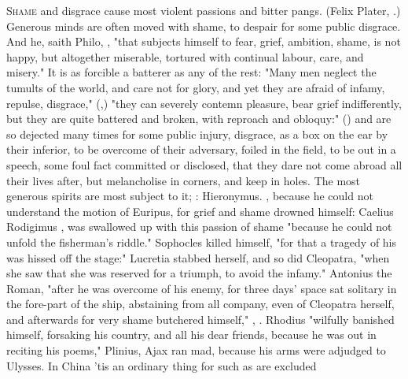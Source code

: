\lettrine{S}{hame} and disgrace cause most violent passions and bitter pangs.
 (Felix Plater, .) Generous minds are often moved with shame, to despair for some
public disgrace. And he, saith Philo, , "that subjects himself to fear, grief, ambition,
shame, is not happy, but altogether miserable, tortured with continual labour,
care, and misery." It is as forcible a batterer as any of the rest:
"Many men neglect the tumults of the world, and care not
for glory, and yet they are afraid of infamy, repulse, disgrace,"
(,) "they can severely contemn pleasure,
bear grief indifferently, but they are quite battered and
broken, with reproach and obloquy:" () and are so dejected many times for some public injury, disgrace, as
a box on the ear by their inferior, to be overcome of their adversary, foiled
in the field, to be out in a speech, some foul fact committed or disclosed,
\etc{} that they dare not come abroad all their lives after, but melancholise
in corners, and keep in holes. The most generous spirits are most subject to
it; : Hieronymus. \Aristotle{}, because he
could not understand the motion of Euripus, for grief and shame drowned
himself: Caelius Rodigimus  , was swallowed up with this passion of
shame "because he could not unfold the fisherman's
riddle." Sophocles killed himself, "for that a tragedy of
his was hissed off the stage:"  Lucretia stabbed herself, and so did Cleopatra,
"when she saw that she was reserved for a triumph, to avoid the infamy."
Antonius the Roman, "after he was overcome of his enemy,
for three days' space sat solitary in the fore-part of the ship, abstaining
from all company, even of Cleopatra herself, and afterwards for very shame
butchered himself," \Plutarch{}, . \Apollonius{}
Rhodius "wilfully banished himself, forsaking his country,
and all his dear friends, because he was out in reciting his poems," Plinius,
 Ajax ran mad, because his arms were
adjudged to Ulysses. In China 'tis an ordinary thing for such as are excluded
